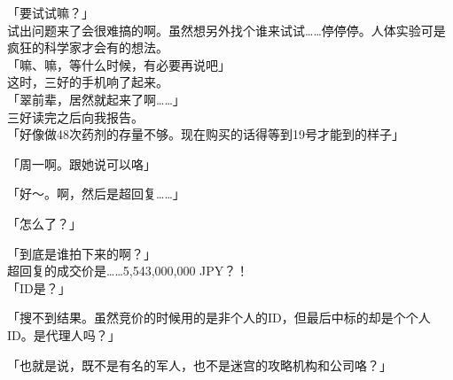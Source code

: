 「要试试嘛？」\\

试出问题来了会很难搞的啊。虽然想另外找个谁来试试……停停停。人体实验可是疯狂的科学家才会有的想法。\\

「嘛、嘛，等什么时候，有必要再说吧」\\

这时，三好的手机响了起来。\\

「翠前辈，居然就起来了啊……」\\

三好读完之后向我报告。\\

「好像做48次药剂的存量不够。现在购买的话得等到19号才能到的样子」

「周一啊。跟她说可以咯」

「好～。啊，然后是超回复……」

「怎么了？」

「到底是谁拍下来的啊？」\\

超回复的成交价是……5,543,000,000 JPY？！\\

「ID是？」

「搜不到结果。虽然竞价的时候用的是非个人的ID，但最后中标的却是个个人ID。是代理人吗？」

「也就是说，既不是有名的军人，也不是迷宫的攻略机构和公司咯？」

